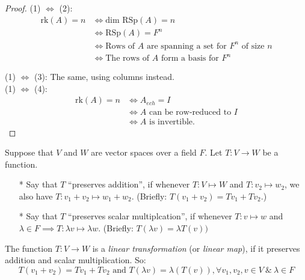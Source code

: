 \documentclass[twoside]{scrartcl}
\begin{document}
\begin{proof}
(1) $\iff$ (2):\\
\[\begin{aligned}
\text{rk}(A) = n & \iff \text{dim RSp}(A) = n\\
&\iff \text{RSp}(A) = F^n\\
& \iff \text{Rows of } A \text{ are spanning a set for } F^n \text{ of size } n\\
& \iff \text{The rows of } A \text{ form a basis for }F^n
\end{aligned}
\]

(1) $\iff$ (3): The same, using columns instead.\\

(1) $\iff$ (4): 
\[
\begin{aligned}
\text{rk}(A) = n &\iff A_{ech} = I\\
&\iff A \text{ can be row-reduced to } I\\
&\iff A \text{ is invertible.}
\end{aligned}\]
\end{proof}

Suppose that $V$ and $W$ are vector spaces over a field $F$. Let $T: V \to W$ be a function.

\begin{itemize}
\item[*] Say that $T$ ``preserves addition'', if whenever $T: V \mapsto W$ and $T: v_2 \mapsto w_2$, we also have $T: v_1 + v_2 \mapsto w_1 + w_2$. (Briefly: $T(v_1 + v_2)=Tv_1 +Tv_2$.)
\item[*] Say that $T$ ``preserves scalar multiplcation'', if whenever $T: v \mapsto w$ and $\lambda \in F \implies T: \lambda v \mapsto \lambda w$. (Briefly: $T(\lambda v) = \lambda T(v))$
\end{itemize}

\begin{definition}The function $T: V \to W$ is a \emph{linear transformation} (or \emph{linear map}), if it preserves addition and scalar multiplication. So:
\[T(v_1 + v_2)=Tv_1 +Tv_2 \text{ and }T(\lambda v) = \lambda(T(v)), \forall v_1,v_2,v \in V ~\&~ \lambda \in F\]
\end{definition}\vspace*{10pt}
\end{document}
